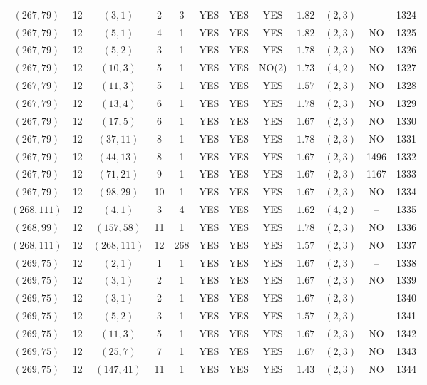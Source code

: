 \begin{longtable}{|c|c|c|c|c|c|c|c|c|c|c|c|}
$(267,79)$ & 12 & $(3,1)$ & 2 & 3 & YES & YES & YES & $1.82$ & $(2,3)$ & -- & 1324\\
$(267,79)$ & 12 & $(5,1)$ & 4 & 1 & YES & YES & YES & $1.82$ & $(2,3)$ & NO & 1325\\
$(267,79)$ & 12 & $(5,2)$ & 3 & 1 & YES & YES & YES & $1.78$ & $(2,3)$ & NO & 1326\\
$(267,79)$ & 12 & $(10,3)$ & 5 & 1 & YES & YES & NO(2) & $1.73$ & $(4,2)$ & NO & 1327\\
$(267,79)$ & 12 & $(11,3)$ & 5 & 1 & YES & YES & YES & $1.57$ & $(2,3)$ & NO & 1328\\
$(267,79)$ & 12 & $(13,4)$ & 6 & 1 & YES & YES & YES & $1.78$ & $(2,3)$ & NO & 1329\\
$(267,79)$ & 12 & $(17,5)$ & 6 & 1 & YES & YES & YES & $1.67$ & $(2,3)$ & NO & 1330\\
$(267,79)$ & 12 & $(37,11)$ & 8 & 1 & YES & YES & YES & $1.78$ & $(2,3)$ & NO & 1331\\
$(267,79)$ & 12 & $(44,13)$ & 8 & 1 & YES & YES & YES & $1.67$ & $(2,3)$ & 1496 & 1332\\
$(267,79)$ & 12 & $(71,21)$ & 9 & 1 & YES & YES & YES & $1.67$ & $(2,3)$ & 1167 & 1333\\
$(267,79)$ & 12 & $(98,29)$ & 10 & 1 & YES & YES & YES & $1.67$ & $(2,3)$ & NO & 1334\\
$(268,111)$ & 12 & $(4,1)$ & 3 & 4 & YES & YES & YES & $1.62$ & $(4,2)$ & -- & 1335\\
$(268,99)$ & 12 & $(157,58)$ & 11 & 1 & YES & YES & YES & $1.78$ & $(2,3)$ & NO & 1336\\
$(268,111)$ & 12 & $(268,111)$ & 12 & 268 & YES & YES & YES & $1.57$ & $(2,3)$ & NO & 1337\\
$(269,75)$ & 12 & $(2,1)$ & 1 & 1 & YES & YES & YES & $1.67$ & $(2,3)$ & -- & 1338\\
$(269,75)$ & 12 & $(3,1)$ & 2 & 1 & YES & YES & YES & $1.67$ & $(2,3)$ & NO & 1339\\
$(269,75)$ & 12 & $(3,1)$ & 2 & 1 & YES & YES & YES & $1.67$ & $(2,3)$ & -- & 1340\\
$(269,75)$ & 12 & $(5,2)$ & 3 & 1 & YES & YES & YES & $1.57$ & $(2,3)$ & -- & 1341\\
$(269,75)$ & 12 & $(11,3)$ & 5 & 1 & YES & YES & YES & $1.67$ & $(2,3)$ & NO & 1342\\
$(269,75)$ & 12 & $(25,7)$ & 7 & 1 & YES & YES & YES & $1.67$ & $(2,3)$ & NO & 1343\\
$(269,75)$ & 12 & $(147,41)$ & 11 & 1 & YES & YES & YES & $1.43$ & $(2,3)$ & NO & 1344\\

\end{longtable}
